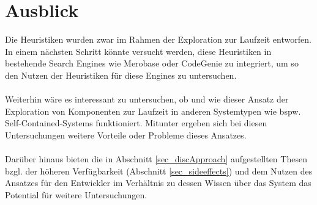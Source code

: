 \section{Ausblick}
Die Heuristiken wurden zwar im Rahmen der Exploration zur Laufzeit entworfen. In einem nächsten Schritt könnte versucht werden, diese Heuristiken in bestehende Search Engines wie Merobase oder CodeGenie zu integriert, um so den Nutzen der Heuristiken für diese Engines zu untersuchen.
\\\\
Weiterhin wäre es interessant zu untersuchen, ob und wie dieser Ansatz der Exploration von Komponenten zur Laufzeit in anderen Systemtypen wie bspw. Self-Contained-Systems funktioniert. Mitunter ergeben sich bei diesen Untersuchungen weitere Vorteile oder Probleme dieses Ansatzes.
\\\\
Darüber hinaus bieten die in Abschnitt \ref{sec_discApproach} aufgestellten Thesen bzgl. der höheren Verfügbarkeit (Abschnitt \ref{sec_sideeffects}) und dem Nutzen des Ansatzes für den Entwickler im Verhältnis zu dessen Wissen über das System das Potential für weitere Untersuchungen.
